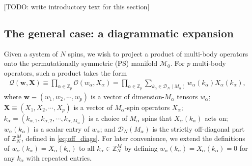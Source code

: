 \documentclass[nofootinbib,notitlepage,11pt]{revtex4-2}
\newcommand{\p}[1]{\left(#1\right)} %
\newcommand{\m}{\bm} %
\newcommand{\1}{\mathds{1}}
\newcommand{\D}{\mathcal{D}}
\newcommand{\M}{\mathcal{M}}
\renewcommand{\O}{\mathcal{O}}
\newcommand{\Q}{\mathcal{Q}}
\newcommand{\ZZ}{\mathbb{Z}}
\newcommand{\red}[1]{{\color{red} #1}}
\begin{document}
\red{[TODO: write introductory text for this section]}

\subsection{The general case: a diagrammatic expansion}

Given a system of $N$ spins, we wish to project a product of
multi-body operators onto the permutationally symmetric (PS) manifold
$\M_0$.  For $p$ multi-body operators, such a product takes the form
\begin{align}
  \Q\p{\m w,\m X}
  \equiv \prod_{\alpha\in\ZZ_p} \O\p{w_\alpha,X_\alpha}
  = \prod_{\alpha\in\ZZ_p} \sum_{k_\alpha\in\D_N\p{M_\alpha}}
  w_\alpha\p{k_\alpha} X_\alpha\p{k_\alpha},
  \label{eq:sym_prod_start}
\end{align}
where $\m w\equiv\p{w_1,w_2,\cdots,w_p}$ is a vector of
dimension-$M_\alpha$ tensors $w_\alpha$;
$\m X\equiv\p{X_1,X_2,\cdots,X_p}$ is a vector of $M_\alpha$-spin
operators $X_\alpha$;
$k_\alpha=\p{k_{\alpha,1},k_{\alpha,2},\cdots,k_{\alpha,M_\alpha}}$ is
a choice of $M_\alpha$ spins that $X_\alpha\p{k_\alpha}$ acts on;
$w_\alpha\p{k_\alpha}$ is a scalar entry of $w_\alpha$; and
$\D_N\p{M_\alpha}$ is the strictly off-diagonal part of $\ZZ_N^M$,
defined in \eqref{eq:off_diags}.  For later convenience, we extend the
definitions of $w_\alpha\p{k_\alpha}=X_\alpha\p{k_\alpha}$ to all
$k_\alpha\in\ZZ_N^M$ by defining
$w_\alpha\p{k_\alpha}=X_\alpha\p{k_\alpha}=0$ for any $k_\alpha$ with
repeated entries.
\end{document}

